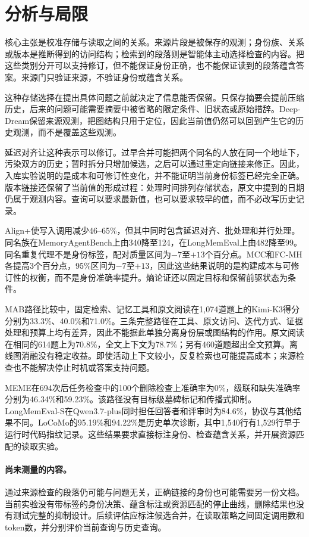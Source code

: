 \section{分析与局限}
\label{sec:analysis}

核心主张是校准存储与读取之间的关系。来源片段是被保存的观测；身份族、关系或版本是推断得到的访问结构；检索到的段落则是智能体主动选择检查的内容。把这些类别分开可以支持修订，但不能保证身份正确，也不能保证读到的段落蕴含答案。来源门只验证来源，不验证身份或蕴含关系。

这种存储选择在提出具体问题之前就决定了信息能否保留。只保存摘要会提前压缩历史，后来的问题可能需要摘要中被省略的限定条件、旧状态或原始措辞。Deep-Dream保留来源观测，把图结构只用于定位，因此当前值仍然可以回到产生它的历史观测，而不是覆盖这些观测。

延迟对齐让这种表示可以修订。过早合并可能把两个同名的人放在同一个地址下，污染双方的历史；暂时拆分只增加候选，之后可以通过重定向链接来修正。因此，入库实验说明的是成本和可修订性变化，并不能证明当前身份标签已经完全正确。版本链接还保留了当前值的形成过程：处理时间排列存储状态，原文中提到的日期仍属于观测内容。查询可以要求最新值，也可以要求较早的值，而不必改写历史记录。

Align+使写入调用减少46--65\%，但其中同时包含延迟对齐、批处理和并行处理。同名族在MemoryAgentBench上由340降至124，在LongMemEval上由482降至99。同名重复代理不是身份标签，配对质量区间为$-7$至$+13$个百分点。MCC和FC-MH各提高3个百分点，95\%区间为$-7$至$+13$，因此这些结果说明的是构建成本与可修订性的权衡，而不是身份准确率提升。熵论证还以固定目标和保留前驱状态为条件。

MAB路径比较中，固定检索、记忆工具和原文阅读在1,074道题上的Kimi-K3得分分别为33.3\%、40.0\%和71.0\%。三条完整路径在工具、原文访问、迭代方式、证据处理和预算上均有差异，因此不能据此单独分离身份层或图结构的作用。原文阅读在相同的614题上为70.8\%，全文上下文为78.7\%；另有460道题超出全文预算。离线图消融没有稳定收益。即使活动上下文较小，反复检索也可能提高成本；来源检查也不能解决停止时机或答案支持问题。

MEME在694次后任务检查中的100个删除检查上准确率为0\%，级联和缺失准确率分别为46.34\%和59.23\%。该路径没有目标级墓碑标记和传播式抑制。LongMemEval-S在Qwen3.7-plus同时担任回答者和评审时为84.6\%，协议与其他结果不同。LoCoMo的95.19\%和94.22\%是历史单次诊断，其中1,540行有1,529行早于运行时代码指纹记录。这些结果要求直接标注身份、检查蕴含关系，并开展资源匹配的读取实验。

\paragraph{尚未测量的内容。} 通过来源检查的段落仍可能与问题无关，正确链接的身份也可能需要另一份文档。当前实验没有带标签的身份决策、蕴含标注或资源匹配的停止曲线，删除结果也没有测试完整的抑制设计。后续评估应标注候选合并，在读取策略之间固定调用数和token数，并分别评价当前查询与历史查询。
